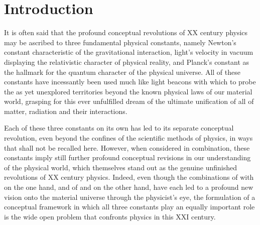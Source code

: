 \documentclass[a4paper,11pt]{article}
\begin{document}
\section{Introduction}
\label{Sect1}

It is often said that the profound conceptual revolutions of
XX\coordHE{} century physics may be ascribed to three
fundamental physical constants, namely Newton's constant \coordHE{}
characteristic of the gravitational interaction, light's velocity
in vacuum \coordHE{} displaying the relativistic character of physical
reality, and Planck's constant \coordHE{} as the hallmark
for the quantum character of the physical universe. All of these
constants have incessantly been used much like light beacons with which
to probe the as yet unexplored territories beyond the known
physical laws of our material world, grasping for this
ever unfulfilled dream of the ultimate unification of all of matter,
radiation and their interactions.

Each of these three constants on its own has led to its separate
conceptual revolution, even beyond the confines of the scientific
methods of physics, in ways that shall not be recalled here. However,
when considered in combination, these constants imply still further profound
conceptual revisions in our understanding of the physical world, which 
themselves stand out as the ge\-nuine unfinished revolutions of XX\coordHE{} 
century physics. Indeed, even though the combinations of \coordHE{} with \coordHE{} on the 
one hand, and of \coordHE{} and \myHighlight{$\hbar$}\coordHE{} on the other hand, have each led to a profound
new vision onto the material universe through the physicist's eye,
the formulation of a conceptual framework in which all three constants
play an equally important role is the wide open problem that confronts
physics in this XXI\coordHE{} century.
\end{document}
